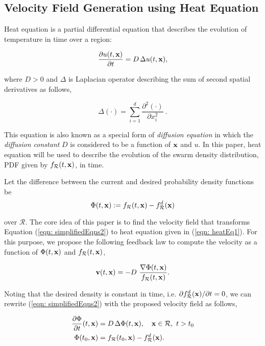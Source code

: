 \documentclass{ifacconf}
\newcommand{\Rconf}{{\mathcal R}}
\newcommand{\bx}{{\bf x}}
\newcommand{\bv}{{\bf v}}
\begin{document}
\subsection{Velocity Field Generation using Heat Equation}
Heat equation is a partial differential equation that describes the evolution of temperature in time over a region:

\begin{equation}
	\frac{\partial u(t,\bx)}{\partial t} = D \hspace{0.5mm} \Delta u(t,\bx),
\end{equation}

where $D > 0$ and $\Delta$ is Laplacian operator describing the sum of second spatial derivatives as follows,

\begin{equation*}
	\Delta(\cdot) = \sum_{i=1}^d \frac{\partial^2 (\cdot)}{\partial x^2_i} \ .
\end{equation*}

This equation is also known as a special form of \emph{diffusion equation} in which the \emph{diffusion constant} $D$ is considered to be a function of $\bx$ and $u$. In this paper, heat equation will be used to describe the evolution of the swarm density distribution, PDF given by $f_\Rconf(t,\bx)$, in time. 

Let the difference between the  current and desired probability density functions be 
\vspace{2mm}
\begin{equation*}
	\Phi(t,\bx) := f_\Rconf(t,\bx) - f_\Rconf^d(\bx)
\end{equation*} 

over $\Rconf$.
The core idea of this paper is to find the velocity field that transforms Equation (\ref{eqn: simplifiedEqns2}) to heat equation given in (\ref{eqn: heatEq1}). For this purpose, we propose the following feedback law to compute the velocity as a function of $\Phi(t,\bx)$ and $f_\Rconf(t,\bx)$, 

\begin{equation}
	\label{eqn: controlLaw}
	\bv(t,\bx) = -D \ \frac{\nabla\Phi(t,\bx)}{f_\Rconf(t,\bx)} .
\end{equation} 

Noting that the desired density is constant in time, i.e. $\partial f_\Rconf^d(\bx) / \partial t = 0$, we can rewrite (\ref{eqn: simplifiedEqns2}) with the proposed velocity field as follows,

\begin{subequations} \label{eqn: heatEq}
	\begin{align}
		\frac{\partial \Phi} {\partial t} (t,\bx) &= D \hspace{0.5mm} \Delta \Phi (t,\bx), \quad \bx \in \Rconf, \ t > t_0 \label{eqn: heatEq1} \\
		\Phi(t_0,\bx) &= f_\Rconf(t_0,\bx) - f_\Rconf^d(\bx).
	\end{align}
\end{subequations}
\end{document}
